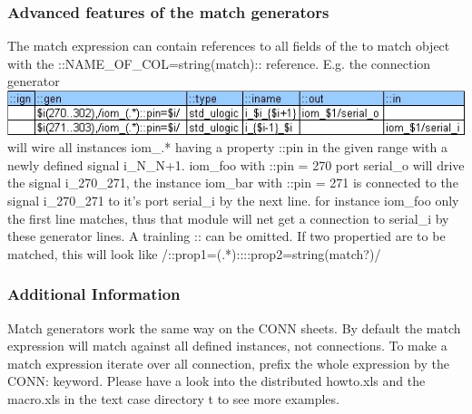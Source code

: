 \documentclass[a4paper,12pt]{article}
\begin{document}
\subsubsection{Advanced features of the match generators}
The match expression can contain references to all fields of the to match object with the\newline
::NAME\_OF\_COL=string(match):: reference.\newline
\newline
E.g. the connection generator\newline
\includegraphics[scale=0.80]{images/gen_2.jpg}\\
will wire all instances iom\_.* having a property ::pin in the given range with a newly defined signal i\_N\_{N+1}. iom\_foo with ::pin = 270 port serial\_o will drive the signal i\_270\_271, the instance iom\_bar with ::pin = 271 is connected to the signal i\_270\_271 to it's port serial\_i by the next line. for instance iom\_foo only the first line matches, thus that module will net get a connection to serial\_i by these generator lines.\newline
\newline
A trainling :: can be omitted. If two propertied are to be matched, this will look like\newline
\hspace*{10mm}/::prop1=(.*)::::prop2=string(match?)/

\subsubsection{Additional Information}
Match generators work the same way on the CONN sheets. By default the match expression will match against all defined instances, not connections.\newline
To make a match expression iterate over all connection, prefix the whole expression by the CONN: keyword.\newline
\newline
Please have a look into the distributed howto.xls and the macro.xls in the text case directory t to see more examples.
\end{document}
